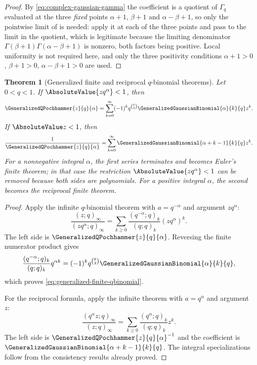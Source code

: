 \documentclass[11pt,a4paper,oneside,openany]{book}
\newtheorem{theorem}{Theorem}[chapter]
\theoremstyle{definition}
\theoremstyle{remark}
\begin{document}
\begin{proof}
By \eqref{eq:complex-gaussian-gamma} the coefficient is a quotient of $\Gamma_q$ evaluated at the
three \emph{fixed} points $\alpha+1$, $\beta+1$ and $\alpha-\beta+1$, so only the pointwise limit
of  is needed: apply it at each of the three points and pass to
the limit in the quotient, which is legitimate because the limiting denominator
$\Gamma(\beta+1)\Gamma(\alpha-\beta+1)$ is nonzero, both factors being positive.  Local uniformity
is not required here, and only the three positivity conditions $\alpha+1>0$, $\beta+1>0$,
$\alpha-\beta+1>0$ are used.
\end{proof}

\begin{theorem}[Generalized finite and reciprocal $q$-binomial theorems]\label{thm:generalized-qbinomial}
Let $0<q<1$.  If $\AbsoluteValue{zq^\alpha}<1$, then
\[
 \GeneralizedQPochhammer{z}{q}{\alpha}
 =\sum_{k=0}^{\infty}(-1)^kq^{\binom k2}
   \GeneralizedGaussianBinomial{\alpha}{k}{q} z^k.
 \label{eq:generalized-finite-qbinomial}
\]
If $\AbsoluteValue z<1$, then
\[
 \frac1{\GeneralizedQPochhammer{z}{q}{\alpha}}
 =\sum_{k=0}^{\infty}
   \GeneralizedGaussianBinomial{\alpha+k-1}{k}{q} z^k.
 \label{eq:generalized-reciprocal-qbinomial}
\]
For a nonnegative integral $\alpha$, the first series terminates and becomes Euler's finite theorem; in that case the restriction $\AbsoluteValue{zq^\alpha}<1$ can be removed because both sides are polynomials.  For a positive integral $\alpha$, the second becomes the reciprocal finite theorem.
\end{theorem}

\begin{proof}
Apply the infinite $q$-binomial theorem with
\(
 a=q^{-\alpha}
\)
and argument $zq^\alpha$:
\[
 \frac{(z;q)_\infty}{(zq^\alpha;q)_\infty}
 =\sum_{k\ge0}\frac{(q^{-\alpha};q)_k}{(q;q)_k}
 (zq^\alpha)^k.
\]
The left side is $\GeneralizedQPochhammer{z}{q}{\alpha}$.  Reversing the finite numerator product gives
\[
 \frac{(q^{-\alpha};q)_k}{(q;q)_k}q^{\alpha k}
 =(-1)^kq^{\binom k2}
   \GeneralizedGaussianBinomial{\alpha}{k}{q},
\]
which proves \eqref{eq:generalized-finite-qbinomial}.

For the reciprocal formula, apply the infinite theorem with $a=q^\alpha$ and argument $z$:
\[
 \frac{(q^\alpha z;q)_\infty}{(z;q)_\infty}
 =\sum_{k\ge0}\frac{(q^\alpha;q)_k}{(q;q)_k}z^k.
\]
The left side is $\GeneralizedQPochhammer{z}{q}{\alpha}^{-1}$ and the coefficient is
$\GeneralizedGaussianBinomial{\alpha+k-1}{k}{q}$.  The integral specializations follow from the consistency results already proved.
\end{proof}
\end{document}

